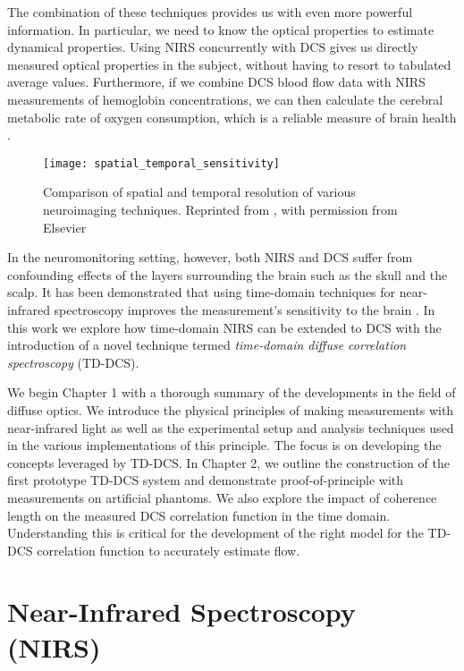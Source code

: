 The combination of these techniques provides us with even more powerful information. In particular, we need to know the optical properties to estimate dynamical properties. Using NIRS concurrently with DCS gives us directly measured optical properties in the subject, without having to resort to tabulated average values. Furthermore, if we combine DCS blood flow data with NIRS measurements of hemoglobin concentrations, we can then calculate the cerebral metabolic rate of oxygen consumption, which is a reliable measure of brain health \cite{Durduran2010, Lin2013}.

\begin{figure}[tb]
    \centering
    \texttt{[image: spatial\_temporal\_sensitivity]}
    \caption{Comparison of spatial and temporal resolution of various neuroimaging techniques. Reprinted from \cite{Strangman2002}, with permission from Elsevier}
    \label{fig:time_space_resolution}
\end{figure}

In the neuromonitoring setting, however, both NIRS and DCS suffer from confounding effects of the layers surrounding the brain such as the skull and the scalp. It has been demonstrated that using time-domain techniques for near-infrared spectroscopy improves the measurement's sensitivity to the brain \cite{Selb2005}. In this work we explore how time-domain NIRS can be extended to DCS with the introduction of a novel technique termed \emph{time-domain diffuse correlation spectroscopy} (TD-DCS).

We begin Chapter 1 with a thorough summary of the developments in the field of diffuse optics. We introduce the physical principles of making measurements with near-infrared light as well as the experimental setup and analysis techniques used in the various implementations of this principle. The focus is on developing the concepts leveraged by TD-DCS. In Chapter 2, we outline the construction of the first prototype TD-DCS system and demonstrate proof-of-principle with measurements on artificial phantoms. We also explore the impact of coherence length on the measured DCS correlation function in the time domain. Understanding this is critical for the development of the right model for the TD-DCS correlation function to accurately estimate flow.

\section{Near-Infrared Spectroscopy (NIRS)} \label{sec:NIRS}

